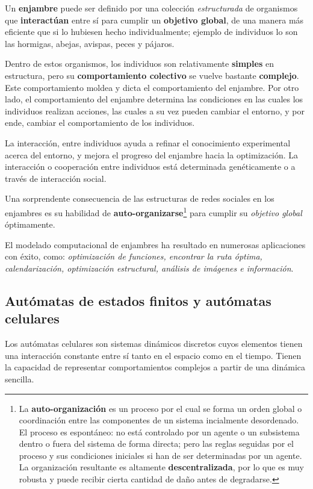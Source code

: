 \documentclass[10pt,a4paper]{article}
\begin{document}
Un \textbf{enjambre} puede ser definido por una colección \textit{estructurada} de organismos que \textbf{interactúan} entre sí para cumplir un \textbf{objetivo global}, de una manera más eficiente que si lo hubiesen hecho individualmente; ejemplo de individuos lo son las hormigas, abejas, avispas, peces y pájaros. 

Dentro de estos organismos, los individuos son relativamente \textbf{simples} en estructura, pero su \textbf{comportamiento colectivo} se vuelve bastante \textbf{complejo}. Este comportamiento moldea y dicta el comportamiento del enjambre. Por otro lado, el comportamiento del enjambre determina las condiciones en las cuales los individuos realizan acciones, las cuales a su vez pueden cambiar el entorno, y por ende, cambiar el comportamiento de los individuos.

La interacción, entre individuos ayuda a refinar el conocimiento experimental acerca del entorno, y mejora el progreso del enjambre hacia la optimización. La interacción o cooperación entre individuos está determinada genéticamente o a través de interacción social.

Una sorprendente consecuencia de las estructuras de redes sociales en los enjambres es su habilidad de \textbf{auto-organizarse}\footnote{La \textbf{auto-organización} es un proceso por el cual se forma un orden global o coordinación entre las componentes de un sistema incialmente desordenado. El proceso es espontáneo: no está controlado por un agente o un subsistema dentro o fuera del sistema de forma directa; pero las reglas seguidas por el proceso y sus condiciones iniciales si han de ser determinadas por un agente. La organización resultante es altamente \textbf{descentralizada}, por lo que es muy robusta y puede recibir cierta cantidad de daño antes de degradarse.} para cumplir su \textit{objetivo global} óptimamente.

El modelado computacional de enjambres ha resultado en numerosas aplicaciones con éxito, como: \textit{optimización de funciones, encontrar la ruta óptima, calendarización, optimización estructural, análisis de imágenes e información}.

\subsection{Autómatas de estados finitos y autómatas celulares}

Los autómatas celulares son sistemas dinámicos discretos cuyos elementos tienen una interacción constante entre sí tanto en el espacio como en el tiempo.  Tienen la capacidad de representar comportamientos complejos a partir de una dinámica sencilla. 
\end{document}
